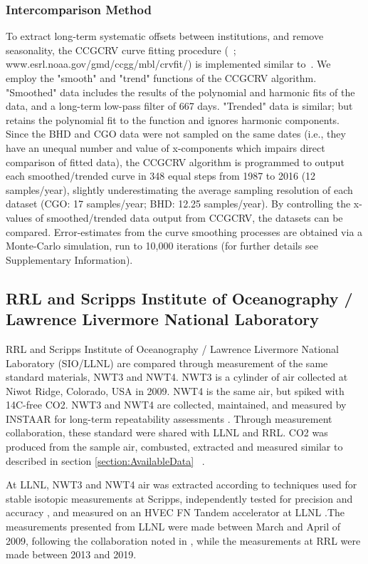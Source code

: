 \subsubsection{Intercomparison Method}
To extract long-term systematic offsets between institutions, and remove seasonality, the CCGCRV curve fitting procedure (~\cite{thoning1989}; www.esrl.noaa.gov/gmd/ccgg/mbl/crvfit/) is implemented similar to~\cite{turnbull2017}. We employ the "smooth" and "trend" functions of the CCGCRV algorithm. "Smoothed" data includes the results of the polynomial and harmonic fits of the data, and a long-term low-pass filter of 667 days. "Trended" data is similar; but retains the polynomial fit to the function and ignores harmonic components. 
Since the BHD and CGO data were not sampled on the same dates (i.e., they have an unequal number and value of x-components which impairs direct comparison of fitted data), the CCGCRV algorithm is programmed to output each smoothed/trended curve in 348 equal steps from 1987 to 2016 (12 samples/year), slightly underestimating the average sampling resolution of each dataset (CGO: 17 samples/year; BHD: 12.25 samples/year). By controlling the x-values of smoothed/trended data output from CCGCRV, the datasets can be compared. 
Error-estimates from the curve smoothing processes are obtained via a Monte-Carlo simulation, run to 10,000 iterations (for further details see Supplementary Information).


\subsection{RRL and Scripps Institute of Oceanography / Lawrence Livermore National Laboratory}

RRL and Scripps Institute of Oceanography / Lawrence Livermore National Laboratory (SIO/LLNL) are compared through measurement of the same standard materials, NWT3 and NWT4. NWT3 is a cylinder of air collected at Niwot Ridge, Colorado, USA in 2009. NWT4 is the same air, but spiked with 14C-free CO2. NWT3 and NWT4 are collected, maintained, and measured by INSTAAR for long-term repeatability assessments \cite{lehman2013allocation}. Through measurement collaboration, these standard were shared with LLNL and RRL. 
CO2 was produced from the sample air, combusted, extracted and measured similar to described in section \ref{section:AvailableData} ~\cite{turnbull2015b}.

At LLNL, NWT3 and NWT4 air was extracted according to techniques used for stable isotopic measurements at Scripps, independently tested for precision and accuracy \cite{guenther2001}, and measured on an HVEC FN Tandem accelerator at LLNL \cite{graven2007methods}.The measurements presented from LLNL were made between March and April of 2009, following the collaboration noted in \cite{lehman2013allocation}, while the measurements at RRL were made between 2013 and 2019. 



